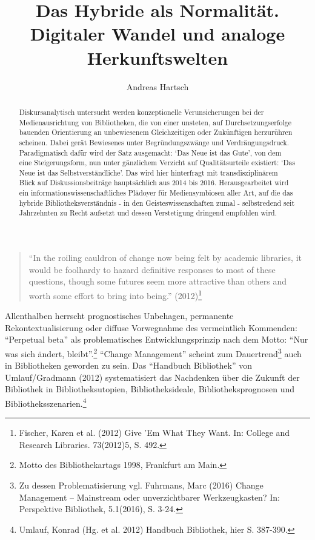 \documentclass[a4paper,
fontsize=11pt,
oneside,
numbers=noperiodatend,
parskip=half-,
bibliography=totoc,
final
]{scrartcl}
\title{\LARGE{Das Hybride als Normalität. Digitaler Wandel und analoge Herkunftswelten}} %
\author{Andreas Hartsch} %
\date{}
\begin{document}
\maketitle
\thispagestyle{fancyplain} 

\begin{abstract}
Diskursanalytisch untersucht werden konzeptionelle Verunsicherungen bei
der Medienausrichtung von Bibliotheken, die von einer unsteten, auf
Durchsetzungserfolge bauenden Orientierung an unbewiesenem
Gleichzeitigen oder Zukünftigen herzurühren scheinen. Dabei gerät
Bewiesenes unter Begründungszwänge und Verdrängungsdruck. Paradigmatisch
dafür wird der Satz ausgemacht: `Das Neue ist das Gute', von dem eine
Steigerungsform, nun unter gänzlichem Verzicht auf Qualitätsurteile
existiert: `Das Neue ist das Selbstverständliche'. Das wird hier
hinterfragt mit transdisziplinärem Blick auf Diskussionsbeiträge
hauptsächlich aus 2014 bis 2016. Herausgearbeitet wird ein
informationswissenschaftliches Plädoyer für Mediensymbiosen aller Art,
auf die das hybride Bibliotheksverständnis - in den
Geisteswissenschaften zumal - selbstredend seit Jahrzehnten zu Recht
aufsetzt und dessen Verstetigung dringend empfohlen wird.
\end{abstract}

\begin{quote}
\enquote{In the roiling cauldron of change now being felt by academic
libraries, it would be foolhardy to hazard definitive responses to most
of these questions, though some futures seem more attractive than others
and worth some effort to bring into being.} (2012)\footnote{Fischer,
  Karen et al. (2012) Give 'Em What They Want. In: College and Research
  Libraries. 73(2012)5, S. 492.}
\end{quote}

Allenthalben herrscht prognostisches Unbehagen, permanente
Rekontextualisierung oder diffuse Vorwegnahme des vermeintlich
Kommenden: \enquote{Perpetual beta} als problematisches
Entwicklungsprinzip nach dem Motto: \enquote{Nur was sich ändert,
bleibt}.\footnote{Motto des Bibliothekartags 1998, Frankfurt am Main.}
\enquote{Change Management} scheint zum Dauertrend\footnote{Zu dessen
  Problematisierung vgl. Fuhrmans, Marc (2016) Change Management --
  Mainstream oder unverzichtbarer Werkzeugkasten? In: Perspektive
  Bibliothek, 5.1(2016), S. 3-24.} auch in Bibliotheken geworden zu
sein. Das \enquote{Handbuch Bibliothek} von Umlauf/Gradmann (2012)
systematisiert das Nachdenken über die Zukunft der Bibliothek in
Bibliotheksutopien, Bibliotheksideale, Bibliotheksprognosen und
Bibliotheksszenarien.\footnote{Umlauf, Konrad (Hg. et al. 2012) Handbuch
  Bibliothek, hier S. 387-390.}
\end{document}
